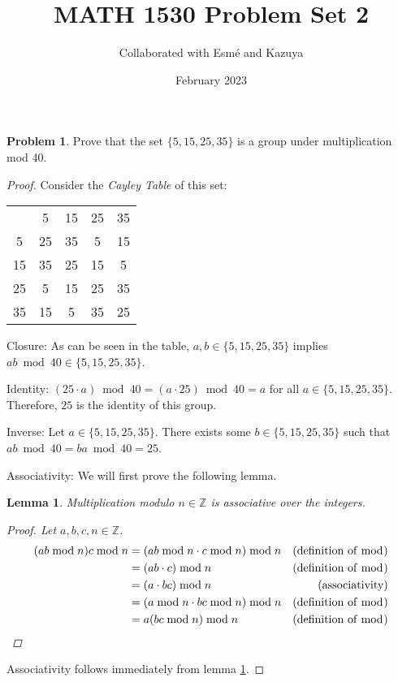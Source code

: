\documentclass[12pt,reqno]{article}
\title{MATH 1530 Problem Set 2}
\author{Collaborated with Esmé and Kazuya}
\date{February 2023}
\newcommand{\Z}{\mathbb{Z}}
\theoremstyle{plain}
\newtheorem{lemma}{Lemma}
\theoremstyle{definition}
\newtheorem{problem}{Problem}
\begin{document}
\maketitle


\begin{problem} Prove that the set $\{5,15,25,35\}$ is a group under multiplication mod 40.
\end{problem}

\begin{proof}
    Consider the \emph{Cayley Table} of this set:
    
    \begin{tabular}{c | c c c c}
         & 5 & 15 & 25 & 35 \\
         \cline{1-5}
         5 & 25 & 35 & 5 & 15\\
         15 & 35 & 25 & 15 & 5\\ 
         25 & 5 & 15 & 25 & 35\\ 
         35 & 15 & 5 & 35 & 25
    \end{tabular}

    Closure: As can be seen in the table, $a,b\in\{5,15,25,35\}$ implies $ab\bmod{40}\in\{5,15,25,35\}$.

    Identity: $(25\cdot a)\bmod{40} = (a\cdot25)\bmod{40}=a$ for all $a\in\{5, 15, 25, 35\}$. Therefore, $25$ is the identity of this group.

    Inverse: Let $a \in \{5, 15, 25, 35\}$. There exists some $b \in \{5, 15, 25, 35\}$ such that $ab\bmod{40} = ba\bmod{40} = 25$.

    Associativity: We will first prove the following lemma.
    \begin{lemma}
    \label{lem:modulo}
    Multiplication modulo $n\in\Z$ is associative over the integers.
    \begin{proof}
        Let $a,b,c,n\in\Z$.
        \begin{align*}
            (ab\bmod{n})c\bmod{n} &= (ab\bmod{n} \cdot c\bmod{n})\bmod{n} & \text{(definition of $\bmod$)}\\
            &= (ab\cdot c)\bmod{n} & \text{(definition of $\bmod$)}\\
            &= (a\cdot bc)\bmod{n} & \text{(associativity)}\\
            &= (a\bmod{n}\cdot bc\bmod{n})\bmod{n} & \text{(definition of $\bmod$)}\\
            &= a(bc\bmod{n})\bmod{n} & \text{(definition of $\bmod$)}
        \end{align*}
    \end{proof}
    \end{lemma}
    
    Associativity follows immediately from lemma \ref{lem:modulo}.
    \end{proof}
    
\end{document}
